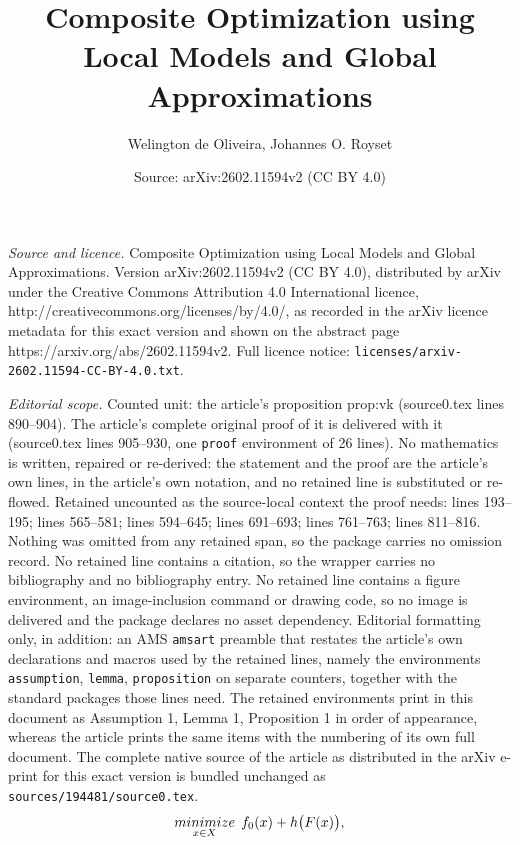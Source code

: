 \documentclass[10pt,a4paper]{amsart}
\title{Composite Optimization using Local Models and Global Approximations}
\author{Welington de Oliveira, Johannes O. Royset}
\date{Source: arXiv:2602.11594v2 (CC BY 4.0)}
\newcommand{\nnmin}{\mathop{\rm minimize}}
\begin{document}
\maketitle

\noindent\emph{Source and licence.} Composite Optimization using Local Models and Global Approximations. Version arXiv:2602.11594v2 (CC BY 4.0), distributed by arXiv under the Creative Commons Attribution 4.0 International licence, http://creativecommons.org/licenses/by/4.0/, as recorded in the arXiv licence metadata for this exact version and shown on the abstract page https://arxiv.org/abs/2602.11594v2. Full licence notice: \texttt{licenses/arxiv-2602.11594-CC-BY-4.0.txt}.\par\smallskip

\noindent\textit{Editorial scope.} Counted unit: the article's proposition prop:vk (source0.tex lines 890--904). The article's complete original proof of it is delivered with it (source0.tex lines 905--930, one \texttt{proof} environment of 26 lines). No mathematics is written, repaired or re-derived: the statement and the proof are the article's own lines, in the article's own notation, and no retained line is substituted or re-flowed.  Retained uncounted as the source-local context the proof needs: lines 193--195; lines 565--581; lines 594--645; lines 691--693; lines 761--763; lines 811--816.  Nothing was omitted from any retained span, so the package carries no omission record.  No retained line contains a citation, so the wrapper carries no bibliography and no bibliography entry.  No retained line contains a figure environment, an image-inclusion command or drawing code, so no image is delivered and the package declares no asset dependency.  Editorial formatting only, in addition: an AMS \texttt{amsart} preamble that restates the article's own declarations and macros used by the retained lines, namely the environments \texttt{assumption}, \texttt{lemma}, \texttt{proposition} on separate counters, together with the standard packages those lines need.  The retained environments print in this document as Assumption 1, Lemma 1, Proposition 1 in order of appearance, whereas the article prints the same items with the numbering of its own full document.  The complete native source of the article as distributed in the arXiv e-print for this exact version is bundled unchanged as \texttt{sources/194481/source0.tex}.
\begin{equation}\label{pbm}
\nnmin_{x\in X}\; f_0(x) + h\big(F(x)\big),
\end{equation} 
\end{document}
